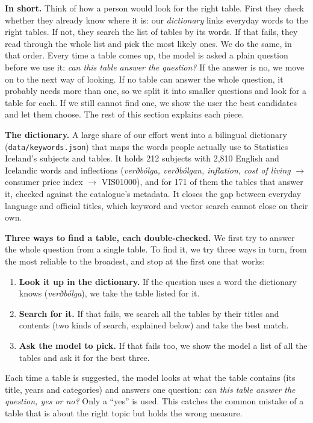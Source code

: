 \documentclass[10pt,a4paper]{article}
\begin{document}
\textbf{In short.} Think of how a person would look for the right table. First they check whether they already know
where it is: our \emph{dictionary} links everyday words to the right tables. If not, they search the list of tables
by its words. If that fails, they read through the whole list and pick the most likely ones. We do the same, in that
order. Every time a table comes up, the model is asked a plain question before we use it: \emph{can this table
answer the question?} If the answer is no, we move on to the next way of looking. If no table can answer the whole
question, it probably needs more than one, so we split it into smaller questions and look for a table for each.
If we still cannot find one, we show the user the best candidates and let them choose. The rest of this section
explains each piece.

\textbf{The dictionary.} A large share of our effort went into a bilingual dictionary (\texttt{data/keywords.json})
that maps the words people actually use to Statistics Iceland's subjects and tables. It holds 212 subjects with 2,810
English and Icelandic words and inflections (\emph{verðbólga, verðbólgan, inflation, cost of living} $\rightarrow$
consumer price index $\rightarrow$ VIS01000), and for 171 of them the tables that answer it, checked against the
catalogue's metadata. It closes the gap between everyday language and official titles, which keyword and vector
search cannot close on their own.

\textbf{Three ways to find a table, each double-checked.} We first try to answer the whole question from a single
table. To find it, we try three ways in turn, from the most reliable to the broadest, and stop at the first one that
works:
\begin{enumerate}
  \item \textbf{Look it up in the dictionary.} If the question uses a word the dictionary knows (\emph{verðbólga}),
        we take the table listed for it.
  \item \textbf{Search for it.} If that fails, we search all the tables by their titles and contents (two kinds of
        search, explained below) and take the best match.
  \item \textbf{Ask the model to pick.} If that fails too, we show the model a list of all the tables and ask it for
        the best three.
\end{enumerate}
Each time a table is suggested, the model looks at what the table contains (its title, years and categories) and
answers one question: \emph{can this table answer the question, yes or no?} Only a ``yes'' is used. This catches
the common mistake of a table that is about the right topic but holds the wrong measure.
\end{document}
